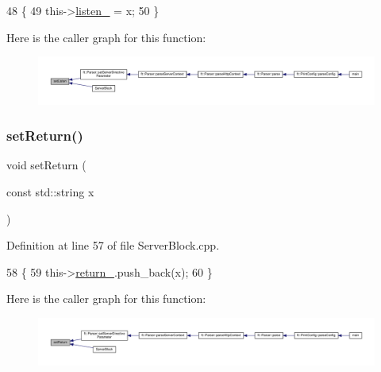 \begin{DoxyCode}
48     \{
49         this->\hyperlink{classft_1_1_server_block_aa3d35e32d01734ff75f940faaee932f5}{listen\_} = x;
50     \}
\end{DoxyCode}
Here is the caller graph for this function\+:
\nopagebreak
\begin{figure}[H]
\begin{center}
\leavevmode
\includegraphics[width=350pt]{classft_1_1_server_block_a6ada7f58bd6d345178035030f68d15d1_icgraph}
\end{center}
\end{figure}
\mbox{\label{classft_1_1_server_block_a041d07c701e052b114ef353d5e588998}} 
\subsubsection{\texorpdfstring{set\+Return()}{setReturn()}}
{\footnotesize\ttfamily void set\+Return (\begin{DoxyParamCaption}\item[{const std\+::string}]{x }\end{DoxyParamCaption})}



Definition at line 57 of file Server\+Block.\+cpp.


\begin{DoxyCode}
58     \{
59         this->\hyperlink{classft_1_1_server_block_abab721f365aff66f8a1289de21c8f01f}{return\_}.push\_back(x);
60     \}
\end{DoxyCode}
Here is the caller graph for this function\+:
\nopagebreak
\begin{figure}[H]
\begin{center}
\leavevmode
\includegraphics[width=350pt]{classft_1_1_server_block_a041d07c701e052b114ef353d5e588998_icgraph}
\end{center}
\end{figure}
\mbox{\label{classft_1_1_base_directives_a2a7990e309f7e38f2915dbbb0d2704cf}} 
